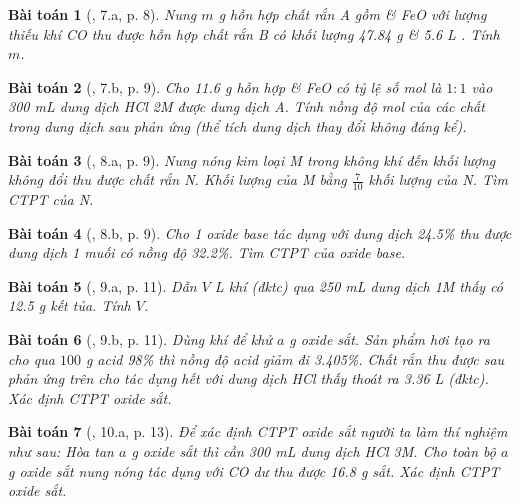 \documentclass{article}
\newtheorem{baitoan}{Bài toán}
\begin{document}
\begin{baitoan}[\cite{An_350_BT_Hoa_Hoc_9}, 7.a, p. 8]
	Nung $m$ \emph{g} hỗn hợp chất rắn A gồm \emph{} \& \emph{FeO} với lượng thiếu khí \emph{CO} thu được hỗn hợp chất rắn B có khối lượng \emph{47.84 g} \& \emph{5.6 L }. Tính $m$.
\end{baitoan}

\begin{baitoan}[\cite{An_350_BT_Hoa_Hoc_9}, 7.b, p. 9]
	Cho \emph{11.6 g} hỗn hợp \emph{} \& \emph{FeO} có tỷ lệ số mol là $1:1$ vào \emph{300 mL} dung dịch \emph{HCl 2M} được dung dịch A. Tính nồng độ mol của các chất trong dung dịch sau phản ứng (thể tích dung dịch thay đổi không đáng kể).
\end{baitoan}

\begin{baitoan}[\cite{An_350_BT_Hoa_Hoc_9}, 8.a, p. 9]
	Nung nóng kim loại M trong không khí đến khối lượng không đổi thu được chất rắn N. Khối lượng của M bằng $\frac{7}{10}$ khối lượng của N. Tìm CTPT của N.
\end{baitoan}

\begin{baitoan}[\cite{An_350_BT_Hoa_Hoc_9}, 8.b, p. 9]
	Cho 1 oxide base tác dụng với dung dịch \emph{ 24.5\%} thu được dung dịch 1 muối có nồng độ \emph{32.2\%}. Tìm CTPT của oxide base.
\end{baitoan}

\begin{baitoan}[\cite{An_350_BT_Hoa_Hoc_9}, 9.a, p. 11]
	Dẫn $V$ \emph{L} khí \emph{} (đktc) qua \emph{250 mL} dung dịch \emph{ 1M} thấy có \emph{12.5 g} kết tủa. Tính $V$.
\end{baitoan}

\begin{baitoan}[\cite{An_350_BT_Hoa_Hoc_9}, 9.b, p. 11]
	Dùng khí \emph{} để khử $a$ \emph{g} oxide sắt. Sản phẩm hơi tạo ra cho qua $100$ \emph{g} acid \emph{ 98\%} thì nồng độ acid giảm đi \emph{3.405\%}. Chất rắn thu được sau phản ứng trên cho tác dụng hết với dung dịch \emph{HCl} thấy thoát ra \emph{3.36 L} \emph{} (đktc). Xác định CTPT oxide sắt.
\end{baitoan}

\begin{baitoan}[\cite{An_350_BT_Hoa_Hoc_9}, 10.a, p. 13]
	Để xác định CTPT oxide sắt người ta làm thí nghiệm như sau: Hòa tan $a$ \emph{g} oxide sắt thì cần \emph{300 mL} dung dịch \emph{HCl 3M}. Cho toàn bộ $a$ \emph{g} oxide sắt nung nóng tác dụng với \emph{CO} dư thu được \emph{16.8 g} sắt. Xác định CTPT oxide sắt.
\end{baitoan}
\end{document}
